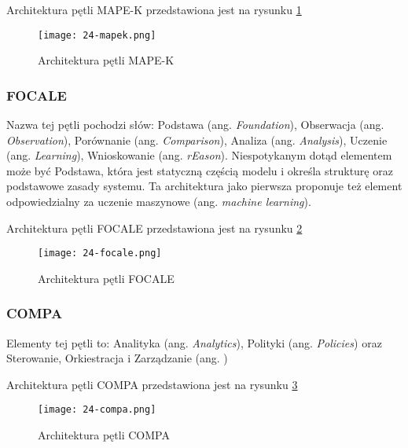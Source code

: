 Architektura pętli MAPE-K przedstawiona jest na rysunku \ref{fig:24-mapek}

\begin{figure}[!h]
    \centering \texttt{[image: 24-mapek.png]}
    \caption{Architektura pętli MAPE-K}\label{fig:24-mapek}
\end{figure}

\subsubsection{FOCALE}
Nazwa tej pętli pochodzi słów: Podstawa (ang. \textit{Foundation}), Obserwacja (ang. \textit{Observation}), Porównanie (ang. \textit{Comparison}), Analiza (ang. \textit{Analysis}), Uczenie (ang. \textit{Learning}), Wnioskowanie (ang. \textit{rEason}). Niespotykanym dotąd elementem może być Podstawa, która jest statyczną częścią modelu i określa strukturę oraz podstawowe zasady systemu. Ta architektura jako pierwsza proponuje też element odpowiedzialny za uczenie maszynowe (ang. \textit{machine learning}). 

Architektura pętli FOCALE przedstawiona jest na rysunku \ref{fig:24-focale}

\begin{figure}[!h]
    \centering \texttt{[image: 24-focale.png]}
    \caption{Architektura pętli FOCALE}\label{fig:24-focale}
\end{figure}

\subsubsection{COMPA}
Elementy tej pętli to: Analityka (ang. \textit{Analytics}), Polityki (ang. \textit{Policies}) oraz Sterowanie, Orkiestracja i Zarządzanie (ang. )

Architektura pętli COMPA przedstawiona jest na rysunku \ref{fig:24-compa}

\begin{figure}[!h]
    \centering \texttt{[image: 24-compa.png]}
    \caption{Architektura pętli COMPA}\label{fig:24-compa}
\end{figure}